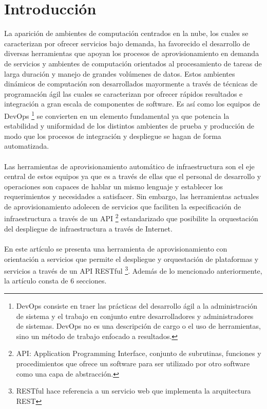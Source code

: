 \documentclass[conference, spanish]{IEEEtran}
\begin{document}
\section{Introducción}
La aparición de ambientes de computación centrados en la nube, los cuales se caracterizan por ofrecer servicios bajo demanda, ha favorecido el desarrollo de diversas herramientas que apoyan los procesos de aprovisionamiento en demanda de servicios y ambientes de computación orientados al procesamiento de tareas de larga duración y manejo de grandes volúmenes de datos. Estos ambientes dinámicos de computación son desarrollados mayormente a través de técnicas de programación ágil las cuales se caracterizan por ofrecer rápidos resultados e integración a gran escala de componentes de software. Es así como los equipos de DevOps \footnote{DevOps consiste en traer las prácticas del desarrollo ágil a la administración de sistema y el trabajo en conjunto entre desarrolladores y administradores de sistemas. DevOps no es una descripción de cargo o el uso de herramientas, sino un método de trabajo enfocado a resultados.} se convierten en un elemento fundamental ya que potencia la estabilidad y uniformidad de los distintos ambientes de prueba y producción de modo que los procesos de integración y despliegue se hagan de forma automatizada. \\
\\
Las herramientas de aprovisionamiento automático de infraestructura son el eje central de estos equipos ya que es a través de ellas que el personal de desarrollo y operaciones son capaces de hablar un mismo lenguaje y establecer los requerimientos y necesidades a satisfacer. Sin embargo, las herramientas actuales de aprovisionamiento adolecen de servicios que faciliten la especificación de infraestructura a través de un API \footnote{ API: Application Programming Interface, conjunto de subrutinas, funciones y procedimientos que ofrece un software para ser utilizado por otro software como una capa de abstracción.} estandarizado que posibilite la orquestación del despliegue de infraestructura a través de Internet.\\
\\
En este artículo se presenta una herramienta de aprovisionamiento con orientación a servicios que permite el despliegue y orquestación de plataformas y servicios a través de un API RESTful \footnote{RESTful hace referencia a un servicio web que implementa la arquitectura REST}. Además de lo mencionado anteriormente, la artículo consta de 6 secciones.\\
\end{document}
